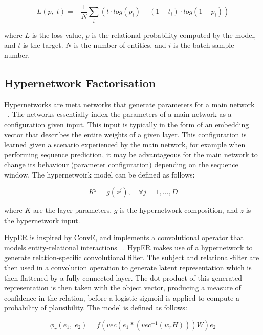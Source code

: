 \begin{equation}
	L(p, \; t) =  -\frac{1}{N}\sum_i(t \cdot log(p_i) + (1 - t_i) \cdot log(1 - p_i))
\end{equation}

where $L$ is the loss value, $p$ is the relational probability computed by the model, and $t$ is the target. $N$ is the number of entities, and $i$ is the batch sample number. \newpage

\subsection{Hypernetwork Factorisation}

Hypernetworks are meta networks that generate parameters for a main network ~\citep{ha2016hypernetworks}. The networks essentially index the parameters of a main network as a configuration given input. This input is typically in the form of an embedding vector that describes the entire weights of a given layer. This configuration is learned given a scenario experienced by the main network, for example when performing sequence prediction, it may be advantageous for the main network to change its behaviour (parameter configuration) depending on the sequence window. The hypernetwoirk model can be defined as follows: 

\begin{equation}
	K^j = g(z^j), \quad \forall j = 1, \dots, D
\end{equation}

where $K$ are the layer parameters, $g$ is the hypernetwork composition, and $z$ is the hypernetwork input. \bigskip

HypER is inspired by ConvE, and implements a convolutional operator that models entity-relational interactions ~\citep{balazevic2019hypernetwork}. HypER makes use of a hypernetwork to generate relation-specific convolutional filter. The subject and relational-filter are then used in a convolution operation to generate latent representation which is then flattened by a fully connected layer. The dot product of this generated representation is then taken with the object vector, producing a measure of confidence in the relation, before a logistic sigmoid is applied to compute a probability of plausibility. The model is defined as follows: 

\begin{equation}
	\phi_r(e_1, \; e_2) = f(vec(e_1 * (vec^{-1}(w_rH)))W)e_2
\end{equation}

